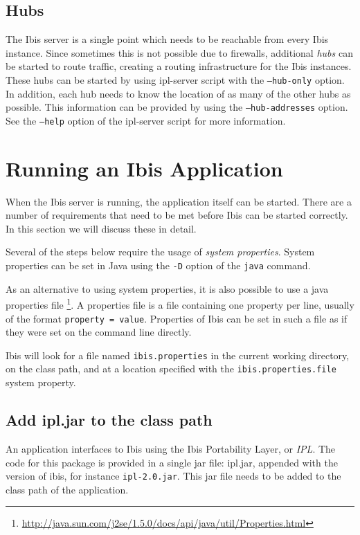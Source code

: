 \documentclass[a4paper,10pt]{article}
\begin{document}
\subsection{Hubs}
\label{hubs}

The Ibis server is a single point which needs to be reachable from every
Ibis instance. Since sometimes this is not possible due to firewalls,
additional \emph{hubs} can be started to route traffic, creating a
routing infrastructure for the Ibis instances. These hubs can be started
by using ipl-server script with the \texttt{--hub-only} option. In
addition, each hub needs to know the location of as many of the other
hubs as possible. This information can be provided by using the
\texttt{--hub-addresses} option. See the \texttt{--help} option of the
ipl-server script for more information.

\section{Running an Ibis Application}

When the Ibis server is running, the application itself can be
started. There are a number of requirements that need to be met before 
Ibis can be started correctly. In this section we will discuss these in detail.

Several of the steps below require the usage of \emph{system properties}. 
System properties can be set in Java using the \texttt{-D} option of the 
\texttt{java} command. 

As an alternative to using system properties, it is also possible to use
a java properties file
\footnote{\url{http://java.sun.com/j2se/1.5.0/docs/api/java/util/Properties.html}}.
A properties file is a file containing one property per line, usually of
the format \texttt{property = value}. Properties of Ibis can be set in
such a file as if they were set on the command line directly.

Ibis will look for a file named \texttt{ibis.properties} in the current working
directory, on the class path, and at a location specified with the
\texttt{ibis.properties.file} system property.

\subsection{Add ipl.jar to the class path}

An application interfaces to Ibis using the Ibis Portability Layer, or
\emph{IPL}. The code for this package is provided in a single jar file:
ipl.jar, appended with the version of ibis, for instance \texttt{ipl-2.0.jar}.
This jar file needs to be added to the class path of the application.
\end{document}
